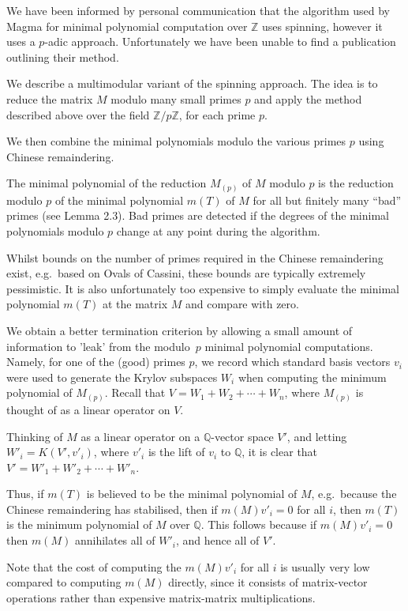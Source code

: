 \documentclass{sig-alternate-05-2015}
\begin{document}
We have been informed by personal communication that the algorithm used by
Magma \cite{magma} for minimal polynomial computation over $\mathbb{Z}$ uses
spinning, however it uses a $p$-adic approach. Unfortunately
we have been unable to find a publication outlining their method.

We describe a multimodular variant of the spinning approach. The idea is to
reduce the matrix $M$ modulo many small primes $p$ and apply the method
described above over the field $\mathbb{Z}/p\mathbb{Z}$, for each prime $p$.

We then combine the minimal polynomials modulo the various primes $p$ using
Chinese remaindering.

The minimal polynomial of the reduction $M_{(p)}$ of $M$ modulo $p$ is the
reduction modulo $p$ of the minimal polynomial $m(T)$ of $M$ for all but
finitely many ``bad'' primes (see \cite{giesbrecht} Lemma 2.3). Bad primes
are detected if the degrees of the minimal polynomials modulo $p$ change at
any point during the algorithm.

Whilst bounds on the number of primes required in the Chinese remaindering
exist, e.g.\ based on Ovals of Cassini, these bounds are typically extremely
pessimistic. It is also unfortunately too expensive to simply evaluate the
minimal polynomial $m(T)$ at the matrix $M$ and compare with zero.

We obtain a better termination criterion by allowing a small amount of
information to 'leak' from the modulo~$p$ minimal polynomial computations.
Namely, for one of the (good) primes $p$, we record which standard
basis vectors $v_i$ were used to generate the Krylov subspaces $W_i$ when
computing the minimum polynomial of $M_{(p)}$. Recall that
$V = W_1 + W_2 + \cdots + W_n$, where $M_{(p)}$ is thought of as a linear
operator on $V$.

Thinking of $M$ as a linear operator on a $\mathbb{Q}$-vector space $V'$,
and letting $W'_i = K(V', v'_i)$, where $v'_i$ is the lift of $v_i$ to
$\mathbb{Q}$, it is clear that $V' = W'_1 + W'_2 + \cdots + W'_n$.

Thus, if $m(T)$ is believed to be the minimal polynomial of $M$,
e.g.\ because the Chinese remaindering has stabilised, then if $m(M)v'_i = 0$
for all $i$, then $m(T)$ is the minimum polynomial of $M$ over $\mathbb{Q}$.
This follows because if $m(M)v'_i = 0$ then $m(M)$ annihilates all of $W'_i$,
and hence all of $V'$.

Note that the cost of computing the $m(M)v'_i$ for all $i$ is usually very low
compared to computing $m(M)$ directly, since it consists of matrix-vector
operations rather than expensive matrix-matrix multiplications.
\end{document}
